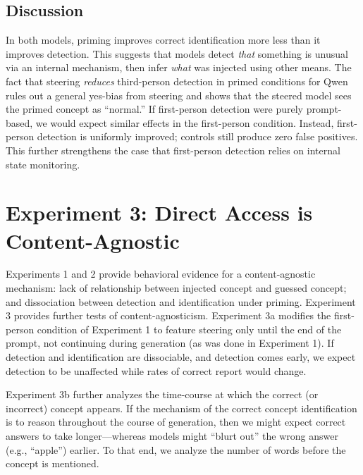 \documentclass{article}
\begin{document}
\vspace{-.03in}
\subsection{Discussion}

In both models, priming improves correct identification more less than it improves detection. This suggests that models detect \emph{that} something is unusual via an internal mechanism, then infer \emph{what} was injected using other means. The fact that steering \emph{reduces} third-person detection in primed conditions for Qwen rules out a general yes-bias from steering and shows that the steered model sees the primed concept as ``normal.'' If first-person detection were purely prompt-based, we would expect similar effects in the first-person condition. Instead, first-person detection is uniformly improved; controls still produce zero false positives. This further strengthens the case that first-person detection relies on internal state monitoring.

\vspace{-.06in}
\section{Experiment 3: Direct Access is Content-Agnostic}
\label{sec:exp3}

Experiments 1 and 2 provide behavioral evidence for a content-agnostic mechanism: lack of relationship between injected concept and guessed concept; and dissociation between detection and identification under priming. Experiment 3 provides further tests of content-agnosticism. Experiment 3a modifies the first-person condition of Experiment 1 to feature steering only until the end of the prompt, not continuing during generation (as was done in Experiment 1).  
 If detection and identification are dissociable, and detection comes early, we expect detection to be unaffected while rates of correct report would change. 

Experiment 3b further analyzes the time-course at which the correct (or incorrect) concept appears. If the mechanism of the correct concept identification is to reason throughout the course of generation, then we might expect correct answers to take longer---whereas models might ``blurt out'' the wrong answer (e.g., ``apple'') earlier. 
To that end, we analyze the number of words before the concept is mentioned.
\end{document}
